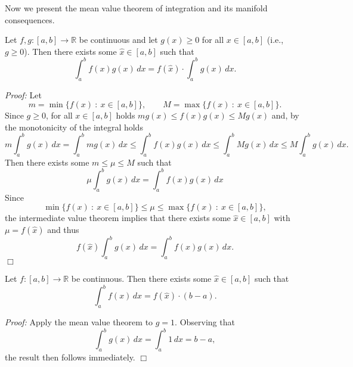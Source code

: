 

Now we present the mean value theorem of integration and its manifold consequences.

\begin{Theorem}
Let $f,g:[a,b]\to\mathbb{R}$ be continuous and let $g(x)\geq0$ for all $x\in[a,b]$ (i.e., $g\geq0$). Then there exists some $\hat{x}\in[a,b]$ such that
\[\int_a^bf(x)g(x)\, dx=f(\hat{x})\cdot \int_a^bg(x)\, dx.\]
\end{Theorem}

{\em Proof:} Let
\[m=\min\{f(x)\::\:x\in[a,b]\},\qquad M=\max\{f(x)\::\:x\in[a,b]\}.\]
Since $g\geq0$, for all $x\in[a,b]$ holds $mg(x)\leq f(x)g(x)\leq Mg(x)$ and, by the monotonicity of the integral holds
\[m\int_a^bg(x)\, dx=\int_a^bmg(x)\, dx\leq \int_a^bf(x)g(x)\, dx\leq \int_a^bMg(x)\, dx\leq M\int_a^bg(x)\, dx.\]
Then there exists some $m\leq\mu\leq M$ such that
\[\mu\int_a^bg(x)\, dx=\int_a^bf(x)g(x)\, dx\]
Since
\[\min\{f(x)\::\:x\in[a,b]\}\leq\mu\leq\max\{f(x)\::\:x\in[a,b]\},\]
the intermediate value theorem implies that there exists some $\hat{x}\in[a,b]$ with $\mu=f(\hat{x})$ and thus
\[f(\hat{x})\int_a^bg(x)\, dx=\int_a^bf(x)g(x)\, dx.\]
$\Box$

\begin{Corollary}{}
Let $f:[a,b]\to\mathbb{R}$ be continuous. Then there exists some $\hat{x}\in[a,b]$ such that
\[\int_a^bf(x)\, dx=f(\hat{x})\cdot (b-a).\]
\end{Corollary}
{\em Proof:} Apply the mean value theorem to $g=1$. Observing that
\[\int_a^bg(x)\, dx=\int_a^b1\, dx= b-a,\]
the result then follows immediately.
$\Box$

